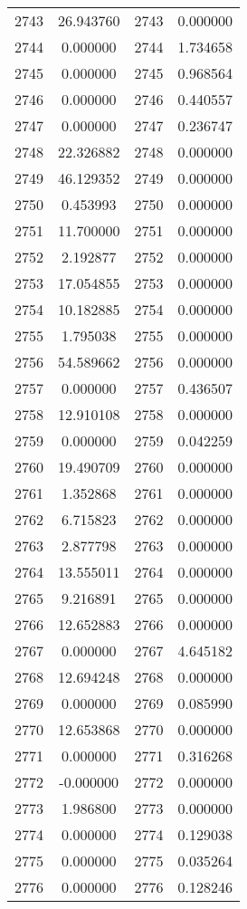 \documentclass[12pt]{article}
\begin{document}
\begin{longtable}{@{}cccc@{}}
2743 & 26.943760 & 2743 & 0.000000 \\
2744 & 0.000000 & 2744 & 1.734658 \\
2745 & 0.000000 & 2745 & 0.968564 \\
2746 & 0.000000 & 2746 & 0.440557 \\
2747 & 0.000000 & 2747 & 0.236747 \\
2748 & 22.326882 & 2748 & 0.000000 \\
2749 & 46.129352 & 2749 & 0.000000 \\
2750 & 0.453993 & 2750 & 0.000000 \\
2751 & 11.700000 & 2751 & 0.000000 \\
2752 & 2.192877 & 2752 & 0.000000 \\
2753 & 17.054855 & 2753 & 0.000000 \\
2754 & 10.182885 & 2754 & 0.000000 \\
2755 & 1.795038 & 2755 & 0.000000 \\
2756 & 54.589662 & 2756 & 0.000000 \\
2757 & 0.000000 & 2757 & 0.436507 \\
2758 & 12.910108 & 2758 & 0.000000 \\
2759 & 0.000000 & 2759 & 0.042259 \\
2760 & 19.490709 & 2760 & 0.000000 \\
2761 & 1.352868 & 2761 & 0.000000 \\
2762 & 6.715823 & 2762 & 0.000000 \\
2763 & 2.877798 & 2763 & 0.000000 \\
2764 & 13.555011 & 2764 & 0.000000 \\
2765 & 9.216891 & 2765 & 0.000000 \\
2766 & 12.652883 & 2766 & 0.000000 \\
2767 & 0.000000 & 2767 & 4.645182 \\
2768 & 12.694248 & 2768 & 0.000000 \\
2769 & 0.000000 & 2769 & 0.085990 \\
2770 & 12.653868 & 2770 & 0.000000 \\
2771 & 0.000000 & 2771 & 0.316268 \\
2772 & -0.000000 & 2772 & 0.000000 \\
2773 & 1.986800 & 2773 & 0.000000 \\
2774 & 0.000000 & 2774 & 0.129038 \\
2775 & 0.000000 & 2775 & 0.035264 \\
2776 & 0.000000 & 2776 & 0.128246 \\

\end{longtable}
\end{document}
